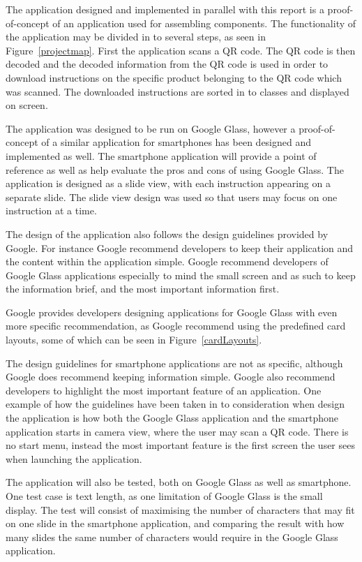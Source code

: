 The application designed and implemented in parallel with this report is a proof-of-concept of an application used for assembling components. The functionality of the application may be divided in to several steps, as seen in Figure~\ref{projectmap}. First the application scans a QR code. The QR code is then decoded and the decoded information from the QR code is used in order to download instructions on the specific product belonging to the QR code which was scanned. The downloaded instructions are sorted in to classes and displayed on screen.

The application was designed to be run on Google Glass, however a proof-of-concept of a similar application for smartphones has been designed and implemented as well. The smartphone application will provide a point of reference as well as help evaluate the pros and cons of using Google Glass. The application is designed as a slide view, with each instruction appearing on a separate slide. The slide view design was used so that users may focus on one instruction at a time.

The design of the application also follows the design guidelines provided by Google. For instance Google recommend developers to keep their application and the content within the application simple. Google recommend developers of Google Glass applications especially to mind the small screen and as such to keep the information brief, and the most important information first.

Google provides developers designing applications for Google Glass with even more specific recommendation, as Google recommend using the predefined card layouts, some of which can be seen in Figure~\ref{cardLayouts}.

The design guidelines for smartphone applications are not as specific, although Google does recommend keeping information simple. Google also recommend developers to highlight the most important feature of an application. One example of how the guidelines have been taken in to consideration when design the application is how both the Google Glass application and the smartphone application starts in camera view, where the user may scan a QR code. There is no start menu, instead the most important feature is the first screen the user sees when launching the application.

The application will also be tested, both on Google Glass as well as smartphone. One test case is text length, as one limitation of Google Glass is the small display. The test will consist of maximising the number of characters that may fit on one slide in the smartphone application, and comparing the result with how many slides the same number of characters would require in the Google Glass application.

